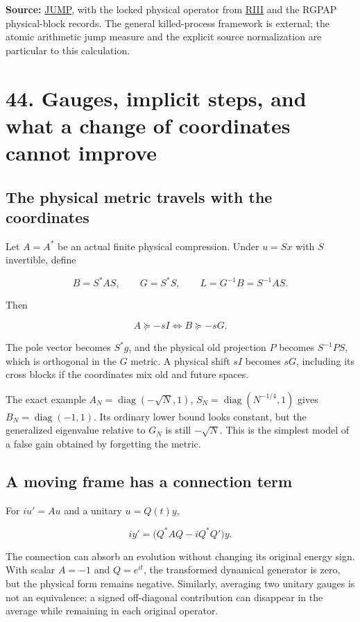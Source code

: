 \documentclass[
  10pt,
  a4paper,
  10pt,
  oneside,
  openany]{book}
\begin{document}
\textbf{Source:} \hyperref[source-jump]{JUMP}, with the locked physical
operator from \hyperref[source-riii]{RIII} and the RGPAP physical-block
records. The general killed-process framework is external; the atomic
arithmetic jump measure and the explicit source normalization are
particular to this calculation.

\section{44. Gauges, implicit steps, and what a change of coordinates
cannot improve}\label{ch-gauges}

\subsection{The physical metric travels with the
coordinates}\label{the-physical-metric-travels-with-the-coordinates}

Let \(A=A^{*}\) be an actual finite physical compression. Under \(u=Sx\)
with \(S\) invertible, define

\[
 B=S^{*}AS,\qquad G=S^{*}S,\qquad L=G^{-1}B=S^{-1}AS.
\]

Then

\[
 A\succeq-sI\iff B\succeq-sG.
 \tag{44.1}\label{eq:44.1}
\]

The pole vector becomes \(S^{*}g\), and the physical old projection
\(P\) becomes \(S^{-1}PS\), which is orthogonal in the \(G\) metric. A
physical shift \(sI\) becomes \(sG\), including its cross blocks if the
coordinates mix old and future spaces.

The exact example \(A_N=\operatorname{diag}(-\sqrt N,1)\),
\(S_N=\operatorname{diag}(N^{-1/4},1)\) gives
\(B_N=\operatorname{diag}(-1,1)\). Its ordinary lower bound looks
constant, but the generalized eigenvalue relative to \(G_N\) is still
\(-\sqrt N\). This is the simplest model of a false gain obtained by
forgetting the metric.

\subsection{A moving frame has a connection
term}\label{a-moving-frame-has-a-connection-term}

For \(iu'=Au\) and a unitary \(u=Q(t)y\),

\[
 iy'=\bigl(Q^{*}AQ-iQ^{*}Q'\bigr)y.
 \tag{44.2}\label{eq:44.2}
\]

The connection can absorb an evolution without changing its original
energy sign. With scalar \(A=-1\) and \(Q=e^{it}\), the transformed
dynamical generator is zero, but the physical form remains negative.
Similarly, averaging two unitary gauges is not an equivalence: a signed
off-diagonal contribution can disappear in the average while remaining
in each original operator.
\end{document}
